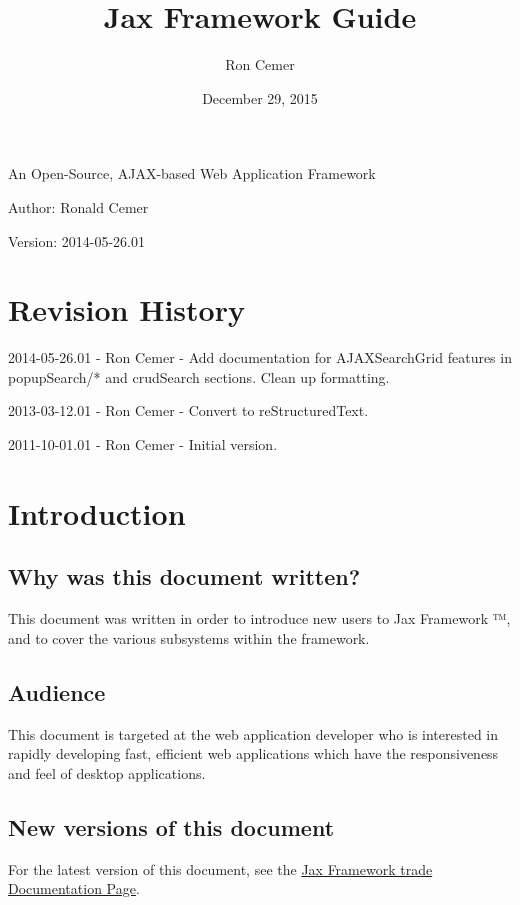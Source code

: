 \documentclass[letterpaper,10pt,english]{sphinxmanual}
\title{Jax Framework Guide}
\date{December 29, 2015}
\author{Ron Cemer}
\begin{document}
\maketitle
\tableofcontents
{}\label{jaxFrameworkGuide::doc}


An Open-Source, AJAX-based Web Application Framework

Author: Ronald Cemer

Version: 2014-05-26.01


\chapter{Revision History}
\label{jaxFrameworkGuide:jax-framework-trade}\label{jaxFrameworkGuide:revision-history}
2014-05-26.01 - Ron Cemer - Add documentation for AJAXSearchGrid features in popupSearch/* and crudSearch
sections.  Clean up formatting.

2013-03-12.01 - Ron Cemer - Convert to reStructuredText.

2011-10-01.01 - Ron Cemer - Initial version.


\chapter{Introduction}
\label{jaxFrameworkGuide:introduction}

\section{Why was this document written?}
\label{jaxFrameworkGuide:why-was-this-document-written}
This document was written in order to introduce new users to Jax Framework ™, and to cover the
various subsystems within the framework.


\section{Audience}
\label{jaxFrameworkGuide:audience}
This document is targeted at the web application developer who is interested in rapidly developing
fast, efficient web applications which have the responsiveness and feel of desktop applications.


\section{New versions of this document}
\label{jaxFrameworkGuide:new-versions-of-this-document}
For the latest version of this document, see the \href{http://jaxframework.org}{Jax Framework \textbar{}trade\textbar{} Documentation Page}.
\end{document}
